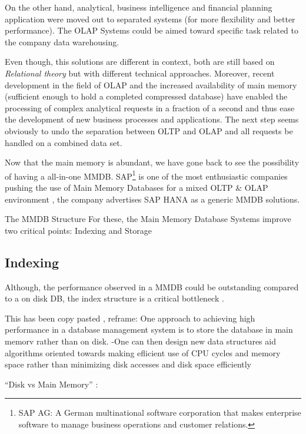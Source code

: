 \documentclass[10pt]{article} %
\begin{document}
    On the other hand, analytical, business intelligence and financial planning application were moved out to separated systems (for more flexibility and better performance). The OLAP Systems could be aimed toward specific task related to the company data warehousing. 
    
    Even though, this solutions are different in context, both are still based on \emph{ Relational theory } but with different technical approaches. 
    Moreover, recent development in the field of OLAP and the increased availability of main memory (sufficient enough to hold a completed compressed database) have enabled the processing of complex analytical requests in a fraction of a second and thus ease the development of new business processes and applications. The next step seems obviously to undo the separation between OLTP and OLAP and all requests be handled on a combined data set.


    Now that the main memory is abundant, we have gone back to see the possibility of having a all-in-one MMDB. SAP\footnote{SAP AG: A German multinational software corporation that makes enterprise software to manage business operations and customer relations.} is one of the most enthusiastic companies pushing the use of Main Memory Databases for a mixed OLTP \& OLAP environment \cite{Plattner}, the company advertises SAP HANA as a generic MMDB solutions. 
    
    The MMDB Structure For these, the Main Memory Database Systems improve two critical points: Indexing and Storage

    
\subsection{Indexing}
Although, the performance observed in a MMDB could be outstanding compared to a on disk DB, the index structure is a critical bottleneck \cite{leisadaptive}. 

This has been copy pasted , reframe: One approach to achieving high performance in a database management system is to store the database in main memorv rather than on disk. -One can then design new data structures aid algorithms oriented towards making eflicient use of CPU cycles and memory space rather than minimizing disk accesses and  disk space efficiently \cite{lehman1986study}

``Disk vs Main Memory'' : 
\end{document}
